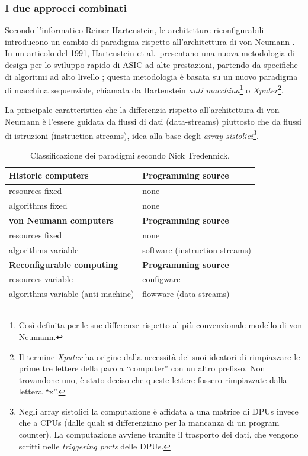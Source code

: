 \subsubsection{I due approcci combinati}
Secondo l'informatico Reiner Hartenstein, le architetture riconfigurabili introducono un
cambio di paradigma rispetto all'architettura di von Neumann
\cite{HartensteinParadigmShift}. In un articolo del 1991, Hartenstein et al.~presentano
una nuova metodologia di design per lo sviluppo rapido di \ac{ASIC} ad alte prestazioni,
partendo da specifiche di algoritmi ad alto livello \cite{HartensteinNovelASICDesign};
questa metodologia è basata su un nuovo paradigma di macchina sequenziale, chiamata da
Hartenstein \emph{anti macchina}\footnote{Così definita per le sue differenze rispetto al
più convenzionale modello di von Neumann.} o \emph{Xputer}\footnote{Il termine
\emph{Xputer} ha origine dalla necessità dei suoi ideatori di rimpiazzare le prime tre
lettere della parola ``computer'' con un altro prefisso. Non trovandone uno, è stato
deciso che queste lettere fossero rimpiazzate dalla lettera ``x''.}.

La principale caratteristica che la differenzia rispetto all'architettura di von Neumann è
l'essere guidata da flussi di dati (data-streams) piuttosto che da flussi di istruzioni
(instruction-streams), idea alla base degli \emph{array sistolici}\footnote{Negli array
sistolici la computazione è affidata a una matrice di \acp{DPU} invece che a \acsp{CPU}
(dalle quali si differenziano per la mancanza di un program counter). La computazione
avviene tramite il trasporto dei dati, che vengono scritti nelle \emph{triggering ports}
delle \acp{DPU}.}.

\begin{table}[ht]
\begin{center}
 \begin{tabular}{l | l}
 \hline
 \textbf{Historic computers} & \textbf{Programming source}\\
 \hline
 resources fixed & none\\
 algorithms fixed & none\\
 \hline
 \textbf{von Neumann computers} & \textbf{Programming source}\\
 \hline
 resources fixed & none\\
 algorithms variable & software (instruction streams)\\
 \hline
 \textbf{Reconfigurable computing} & \textbf{Programming source}\\
 \hline
 resources variable & configware\\
 algorithms variable (anti machine) & flowware (data streams)
 \end{tabular}
 \caption{Classificazione dei paradigmi secondo Nick Tredennick.}
 \label{tab:TredennickClassificationScheme}
 \end{center}
\end{table}

